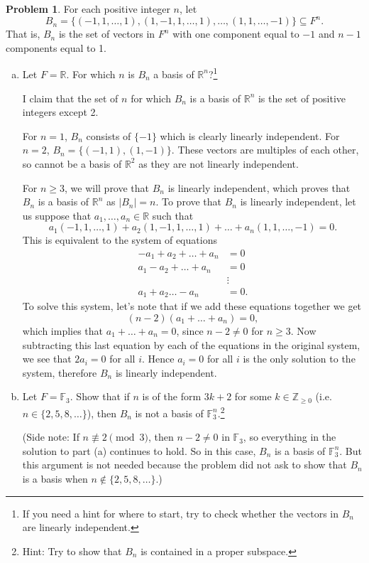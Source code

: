 \documentclass[11pt,oneside]{amsart}
\theoremstyle{definition}
\newtheorem{problem}{Problem}
\newcommand{\bF}{\mathbb{F}}
\newcommand{\bR}{\mathbb{R}}
\newcommand{\bZ}{\mathbb{Z}}
\begin{document}
    \begin{problem}
        For each positive integer $n$, let \[B_n=\{(-1,1,\dots,1),(1,-1,1,\dots,1),\dots,(1,1,\dots,-1)\}\subseteq F^n.\] That is, $B_n$ is the set of vectors in $F^n$ with one component equal to $-1$ and $n-1$ components equal to 1. 
        \begin{enumerate}[(a)]
            \item Let $F=\bR$. For which $n$ is $B_n$ a basis of $\bR^n$?\footnote{If you need a hint for where to start, try to check whether the vectors in $B_n$ are linearly independent.}
            \begin{solution}
                I claim that the set of $n$ for which $B_n$ is a basis of $\bR^n$ is the set of positive integers except 2.
                
                For $n=1$, $B_n$ consists of $\{-1\}$ which is clearly linearly independent. For $n=2$, $B_n=\{(-1,1),(1,-1)\}$. These vectors are multiples of each other, so cannot be a basis of $\bR^2$ as they are not linearly independent.

                For $n\geq 3$, we will prove that $B_n$ is linearly independent, which proves that $B_n$ is a basis of $\bR^n$ as $|B_n|=n$. To prove that $B_n$ is linearly independent, let us suppose that $a_1,\dots,a_n\in\bR$ such that
                \[a_1(-1,1,\dots,1)+a_2(1,-1,1,\dots,1)+\dots+a_n(1,1,\dots,-1)=0.\]
                This is equivalent to the system of equations
                \begin{align*}
                    -a_1+a_2+\dots+a_n &= 0\\
                    a_1-a_2+\dots+a_n &= 0\\
                    &\vdots\\
                    a_1+a_2\dots-a_n &= 0.
                \end{align*}
                To solve this system, let's note that if we add these equations together we get
                \[(n-2)(a_1+\dots+a_n) = 0,\]
                which implies that $a_1+\dots+a_n=0$, since $n-2\neq 0$ for $n\geq 3$. Now subtracting this last equation by each of the equations in the original system, we see that $2a_i=0$ for all $i$. Hence $a_i=0$ for all $i$ is the only solution to the system, therefore $B_n$ is linearly independent.
            \end{solution}
            \item Let $F=\bF_3$. Show that if $n$ is of the form $3k+2$ for some $k\in\bZ_{\geq 0}$ (i.e.\ $n\in\{2,5,8,\dots\}$), then $B_n$ is not a basis of $\bF_3^n$.\footnote{Hint: Try to show that $B_n$ is contained in a proper subspace.}
            \begin{solution}
                (Side note: If $n\not\equiv 2\pmod 3$, then $n-2\neq 0$ in $\bF_3$, so everything in the solution to part (a) continues to hold. So in this case, $B_n$ is a basis of $\bF_3^n$. But this argument is not needed because the problem did not ask to show that $B_n$ is a basis when $n\notin\{2,5,8,\dots\}$.)
                

\end{solution}
\end{enumerate}
\end{problem}
\end{document}
